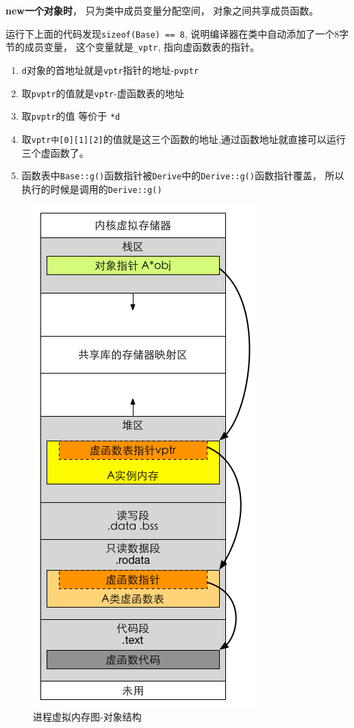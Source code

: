 \documentclass[UTF8,a4paper,12pt]{ctexbook} %
\begin{document}
       \textbf{new一个对象时}， 只为类中成员变量分配空间， 对象之间共享成员函数。
        
       运行下上面的代码发现\verb|sizeof(Base) == 8|, 说明编译器在类中自动添加了一个8字节的成员变量， 这个变量就是\verb|_vptr|, 指向虚函数表的指针。
       
       \begin{enumerate}
	       	\item \verb|d|对象的首地址就是\verb|vptr|指针的地址-\verb|pvptr|
	       	\item 取\verb|pvptr|的值就是\verb|vptr|-虚函数表的地址
	       	\item 取\verb|pvptr|的值 等价于 \verb|*d|
	       	\item 取\verb|vptr中[0][1][2]|的值就是这三个函数的地址,通过函数地址就直接可以运行三个虚函数了。
	       	\item 函数表中\verb|Base::g()|函数指针被\verb|Derive|中的\verb|Derive::g()|函数指针覆盖， 所以执行的时候是调用的\verb|Derive::g()|
       \end{enumerate}
       
       \begin{figure}[h]
       	\centering
       	\includegraphics[scale=0.8]{process.png}
       	\caption{进程虚拟内存图-对象结构}
       \end{figure}
       
\end{document}
